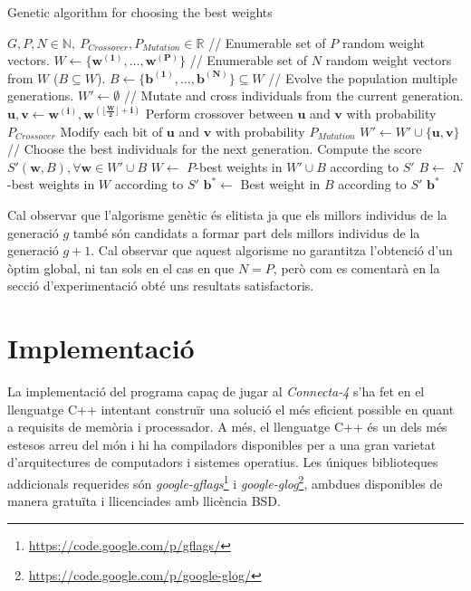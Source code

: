 \documentclass[12pt,a4paper]{article}
\begin{document}
\begin{algorithm}
\caption{Genetic algorithm for choosing the best weights}
\label{alg:genetic_weights}
\begin{algorithmic}[5]
\Require $G, P, N \in \mathbb{N}, ~ P_{Crossover}, P_{Mutation} \in \mathbb{R}$
\State // Enumerable set of $P$ random weight vectors.
\State $W \leftarrow \{\mathbf{w^{(1)}}, \ldots, \mathbf{w^{(P)}} \}$ 
\State // Enumerable set of $N$ random weight vectors from $W$ ($B \subseteq W$).
\State $B \leftarrow \{\mathbf{b^{(1)}}, \ldots, \mathbf{b^{(N)}}\} \subseteq W$
\State // Evolve the population multiple generations.
    \State $W' \leftarrow \emptyset$
    \State // Mutate and cross individuals from the current generation.
	    \State $\mathbf{u}, \mathbf{v} \leftarrow \mathbf{w^{(i)}}, \mathbf{w^{(\lfloor \frac{W}{2} \rfloor + i)}}$
	    \State Perform crossover between $\mathbf{u}$ and $\mathbf{v}$ with probability $P_{Crossover}$
	    \State Modify each bit of $\mathbf{u}$ and $\mathbf{v}$ with probability $P_{Mutation}$
	    		\State $W' \leftarrow W' \cup \{\mathbf{u}, \mathbf{v}\}$
	\EndFor
	\State // Choose the best individuals for the next generation.
	\State Compute the score $S'(\mathbf{w}, B), \forall \mathbf{w} \in W' \cup B$
	\State $W \leftarrow$ $P$-best weights in $W' \cup B$ according to $S'$
	\State $B \leftarrow$ $N$-best weights in $W$ according to $S'$
\EndFor
\State $\mathbf{b}^* \leftarrow$ Best weight in $B$ according to $S'$
\State \Return $\mathbf{b}^*$
\end{algorithmic}
\end{algorithm}

Cal observar que l'algorisme genètic és elitista ja que els millors individus de la generació $g$ també són candidats a formar part dels millors individus de la generació $g+1$. Cal observar que aquest algorisme no garantitza l'obtenció d'un òptim global, ni tan sols en el cas en que $N = P$, però com es comentarà en la secció d'experimentació obté uns resultats satisfactoris.\\

\section{Implementació}
La implementació del programa capaç de jugar al \emph{Connecta-4} s'ha fet en el llenguatge C++ intentant construïr una solució el més eficient possible en quant a requisits de memòria i processador. A més, el llenguatge C++ és un dels més estesos arreu del món i hi ha compiladors disponibles per a una gran varietat d'arquitectures de computadors i sistemes operatius. Les úniques biblioteques addicionals requerides són \emph{google-gflags}\footnote{\url{https://code.google.com/p/gflags/}} i \emph{google-glog}\footnote{\url{https://code.google.com/p/google-glog/}}, ambdues disponibles de manera gratuïta i llicenciades amb llicència BSD.\\
\end{document}

